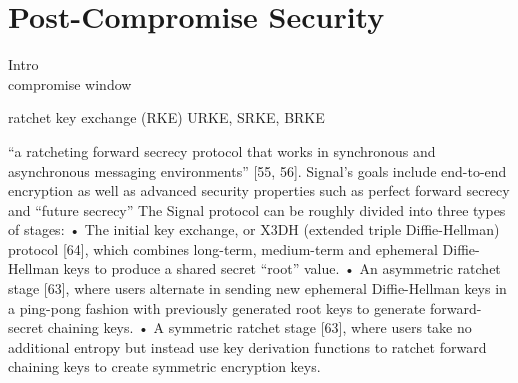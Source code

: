 \chapter{Post-Compromise Security} \label{ch:postcomp}
Intro\\compromise window\\
\par
ratchet key exchange (RKE) URKE, SRKE, BRKE
\par
“a ratcheting
forward secrecy protocol that works in synchronous and asynchronous messaging environments” [55, 56].
Signal’s goals include end-to-end encryption as well as advanced security properties such as perfect forward secrecy and “future secrecy”
The Signal protocol can be roughly divided into three types of stages:
• The initial key exchange, or X3DH (extended triple Diffie-Hellman) protocol [64], which combines
long-term, medium-term and ephemeral Diffie-Hellman keys to produce a shared secret “root” value.
• An asymmetric ratchet stage [63], where users alternate in sending new ephemeral Diffie-Hellman keys in a ping-pong fashion with previously generated root keys to generate forward-secret chaining keys.
• A symmetric ratchet stage [63], where users take no additional entropy but instead use key derivation
functions to ratchet forward chaining keys to create symmetric encryption keys.





